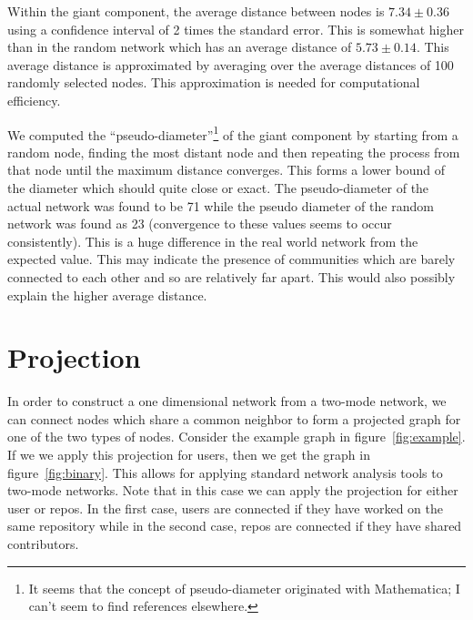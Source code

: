 \documentclass{pset}
\begin{document}
Within the giant component, the average distance between nodes is $7.34 \pm 0.36$
using a confidence interval of 2 times the standard error.
This is somewhat higher than in the random network which has an average
distance of $5.73 \pm 0.14$. This average distance is approximated by averaging
over the average distances of 100 randomly selected nodes. This approximation
is needed for computational efficiency.

We computed the ``pseudo-diameter''\footnote{It seems that the concept of
pseudo-diameter originated with Mathematica; I can't seem to find references
elsewhere.} of the giant component by starting from a random node, finding the
most distant node and then repeating the process from that node until the
maximum distance converges. This forms a lower bound of the diameter which
should quite close or exact. The pseudo-diameter of the actual network was
found to be 71 while the pseudo diameter of the random network was found
as 23 (convergence to these values seems to occur consistently).  This is a
huge difference in the real world network from the expected value.  This may
indicate the presence of communities which are barely connected to each other
and so are relatively far apart. This would also possibly explain the higher
average distance.

\section*{Projection}

In order to construct a one dimensional network from a two-mode network, we can
connect nodes which share a common neighbor to form a projected graph for one
of the two types of nodes.  Consider the example graph in
figure~\ref{fig:example}.  If we we apply this projection for users, then we
get the graph in figure~\ref{fig:binary}.  This allows for applying standard
network analysis tools to two-mode networks. Note that in this case we can apply
the projection for either user or repos. In the first case, 
users are connected if they have worked on the same repository while in the
second case, repos are connected if they have shared contributors.
\end{document}
